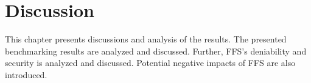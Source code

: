 
\chapter{Discussion}
\label{ch:discussion}
This chapter presents discussions and analysis of the results. The presented benchmarking results are analyzed and discussed. Further, FFS's deniability and security is analyzed and discussed. Potential negative impacts of FFS are also introduced.




